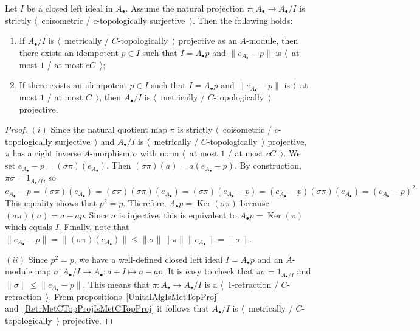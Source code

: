 \begin{proposition}\label{MetTopProjCycModCharac} Let $I$ be a closed left ideal in
$A_\bullet $. Assume the natural projection $\pi:A_\bullet\to A_\bullet/I$ is
strictly $\langle$~coisometric / $c$-topologically surjective~$\rangle$. 
Then the following holds:

\begin{enumerate}[label = (\roman*)]
    \item If $A_\bullet /I$ is $\langle$~metrically / $C$-topologically~$\rangle$
    projective as an $A$-module, then there exists an idempotent $p\in I$ such that
    $I=A_\bullet p$ and $\lVert e_{A_\bullet}-p\rVert$ is $\langle$~at most $1$ / at most
    $cC$~$\rangle$;

    \item If there exists an idempotent $p\in I$ such that $I=A_\bullet  p$ and
    $\lVert e_{A_\bullet }-p\rVert$ is $\langle$~at most $1$ / at most
    $C$~$\rangle$, then $A_\bullet/I$ is $\langle$~metrically /
    $C$-topologically~$\rangle$ projective.
\end{enumerate}
\end{proposition}
\begin{proof} $(i)$ Since the natural quotient map $\pi$ is strictly 
$\langle$~coisometric / $c$-topologically surjective~$\rangle$ and $A_\bullet /I$
is $\langle$~metrically / $C$-topologically~$\rangle$ projective, $\pi$ has
a right inverse $A$-morphism $\sigma$ with norm $\langle$~at most $1$ / at most
$cC$~$\rangle$. We set $e_{A_\bullet }-p=(\sigma\pi)(e_{A_\bullet })$. Then
$(\sigma\pi)(a)=a(e_{A_\bullet }-p)$. By construction, $\pi\sigma=1_{A_\bullet /I}$,
so  
\[
e_{A_\bullet }-p
=(\sigma\pi)(e_{A_\bullet })
=(\sigma\pi)(\sigma\pi)(e_{A_\bullet })
=(\sigma\pi)(e_{A_\bullet }-p)
=(e_{A_\bullet }-p)(\sigma\pi)(e_{A_\bullet })
={(e_{A_\bullet }-p)}^2
\]
This equality shows that $p^2=p$. Therefore, $A_\bullet
p=\operatorname{Ker}(\sigma\pi)$ because $(\sigma\pi)(a)=a-ap$. Since $\sigma$
is injective, this is equivalent to $A_\bullet p=\operatorname{Ker}(\pi)$ which
equals $I$. Finally, note that 
$\lVert e_{A_\bullet }-p\rVert
=\lVert(\sigma\pi)(e_{A_\bullet})\rVert
\leq\lVert\sigma\rVert\lVert\pi\rVert\lVert e_{A_\bullet }\rVert
=\lVert\sigma\rVert$.

$(ii)$ Since $p^2=p$, we have a well-defined closed left ideal $I=A_\bullet p$ and
an $A$-module map $\sigma:A_\bullet /I\to A_\bullet:a+I\mapsto a-ap$. It is easy
to check that $\pi\sigma=1_{A_\bullet/I}$ 
and $\lVert\sigma\rVert\leq\lVert e_{A_\bullet }-p\rVert$. 
This means that $\pi:A_\bullet \to A_\bullet /I$ is a
$\langle$~$1$-retraction / $C$-retraction~$\rangle$. From
propositions~\ref{UnitalAlgIsMetTopProj} 
and~\ref{RetrMetCTopProjIsMetCTopProj} it follows that $A_\bullet /I$ is
$\langle$~metrically / $C$-topologically~$\rangle$ projective.
\end{proof} 

